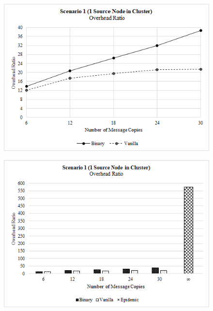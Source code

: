 \documentclass{article}
\begin{document}
\begin{figure}[h!]
\centering
\begin{minipage}[t]{.5\textwidth}
  \centering
  \includegraphics[width=.98\linewidth]{Results/Graphs/OverheadRatio/S1_OverheadRatio_SprayAndWaitComparison.png}
  \label{fig:test1}
\end{minipage}%
\begin{minipage}[t]{.5\textwidth}
  \centering
  \includegraphics[width=.98\linewidth]{Results/Graphs/OverheadRatio/S1_OverheadRatio_AllComparison.png}
  \label{fig:test2}
\end{minipage}


\end{figure}
\end{document}
